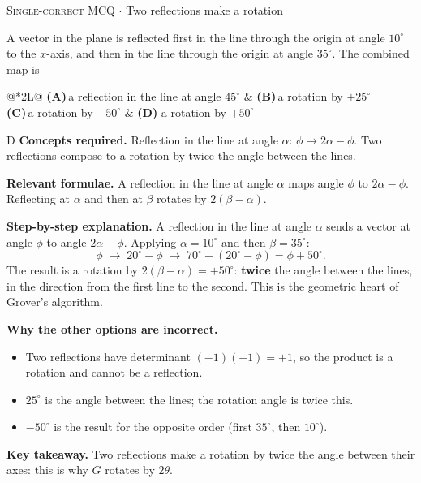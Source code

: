\documentclass[11pt,a4paper]{article}
\newcommand{\optlabel}[1]{\textbf{(#1)}}
\newcommand{\correctlabel}[1]{\textcolor{okgreen}{\textbf{(#1)}\,\ding{51}}}
\newenvironment{qitem}[1]{\begin{list}{}{\setlength{\leftmargin}{3.3em}\setlength{\labelwidth}{3.1em}%
  \setlength{\labelsep}{0.2em}\setlength{\topsep}{3pt}\setlength{\parsep}{3pt}}\item[\textbf{Q.#1}\hfill]}{\end{list}}
\newcommand{\qsep}{\par\vspace{2pt}{\color{black!15}\hrule}\vspace{4pt}}
\newcommand{\qmeta}[2]{{\footnotesize\color{black!60}\textsc{#1} \;$\cdot$\; #2}\par}
\begin{document}
\begin{qitem}{3}
\qmeta{Single-correct MCQ}{Two reflections make a rotation}
A vector in the plane is reflected first in the line through the origin at angle $10^\circ$ to the $x$-axis, and then in the
line through the origin at angle $35^\circ$. The combined map is
\par\smallskip\noindent\begin{tabularx}{\linewidth}{@{}*{2}{L}@{}}
\optlabel{A}\,a reflection in the line at angle $45^\circ$ & \optlabel{B}\,a rotation by $+25^\circ$ \\[3pt]
\optlabel{C}\,a rotation by $-50^\circ$ & \correctlabel{D}\,a rotation by $+50^\circ$
\end{tabularx}
\end{qitem}
\begin{solbox}{D}
\textbf{\color{brand}Concepts required.} Reflection in the line at angle $\alpha$: $\phi \mapsto 2\alpha - \phi$. Two reflections compose to a rotation by twice the angle between the lines.

\textbf{\color{brand}Relevant formulae.} A reflection in the line at angle $\alpha$ maps angle $\phi$ to $2\alpha - \phi$. Reflecting at $\alpha$ and then at $\beta$ rotates by $2(\beta - \alpha)$.

\textbf{\color{brand}Step-by-step explanation.} A reflection in the line at angle $\alpha$ sends a vector at angle $\phi$ to angle $2\alpha - \phi$. Applying $\alpha = 10^\circ$ and then
$\beta = 35^\circ$:
\[ \phi \;\to\; 20^\circ - \phi \;\to\; 70^\circ - (20^\circ - \phi) = \phi + 50^\circ . \]
The result is a rotation by $2(\beta - \alpha) = +50^\circ$: \textbf{twice} the angle between the lines, in the direction from the
first line to the second. This is the geometric heart of Grover's algorithm.

\textbf{\color{brand}Why the other options are incorrect.}
\begin{itemize}[leftmargin=2.4em, itemsep=1pt, topsep=2pt]
\item[\textbf{(A)}] Two reflections have determinant $(-1)(-1) = +1$, so the product is a rotation and cannot be a reflection.
\item[\textbf{(B)}] $25^\circ$ is the angle between the lines; the rotation angle is twice this.
\item[\textbf{(C)}] $-50^\circ$ is the result for the opposite order (first $35^\circ$, then $10^\circ$).
\end{itemize}
\textbf{\color{brand}Key takeaway.} Two reflections make a rotation by twice the angle between their axes: this is why $G$ rotates by $2\theta$.
\end{solbox}
\qsep
\end{document}
